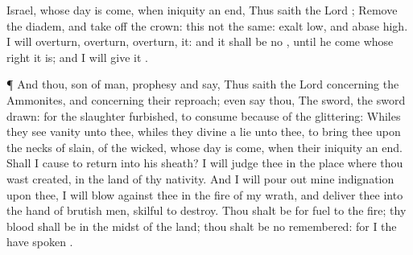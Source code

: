 {Israel, whose
day is
come,
when
iniquity
{} an
end,
Thus
saith the
Lord
{};
Remove the
diadem, and take
off the
crown: this
{} not
{} the
same:
exalt
{}
low, and
abase
{}
high.
I will
overturn,
overturn,
overturn, it: and it shall
be no
{}, until he
come whose
right it is; and I will
give it
{}.
\par }{\PP {}¶ And thou,
son of
man,
prophesy and
say, Thus
saith the
Lord
{} concerning the
Ammonites, and concerning their
reproach; even
say thou, The
sword, the
sword
{}
drawn: for the
slaughter
{}
furbished, to
consume because of the
glittering:
Whiles they
see
vanity unto thee, whiles they
divine a
lie unto thee, to
bring thee upon the
necks of
{}
slain, of the
wicked, whose
day is
come,
when their
iniquity
{} an
end.
Shall I cause
{} to
return into his
sheath? I will
judge thee in the
place where thou wast
created, in the
land of thy
nativity.
And I will pour
out mine
indignation upon thee, I will
blow against thee in the
fire of my
wrath, and
deliver thee into the
hand of
brutish
men,
{}
skilful to
destroy.
Thou shalt be for
fuel to the
fire; thy
blood shall be in the
midst of the
land; thou shalt be no
{}
remembered: for I the
{} have
spoken
{}.

}
